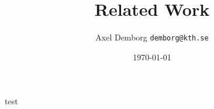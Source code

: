 \documentclass[11pt]{article}
\author{Axel Demborg \texttt{demborg@kth.se}}
\date{\today}
\title{Related Work}
\newcommand{\bibentry}[1]{\cite{#1}}
\begin{document}
\maketitle
 


tes\bibentry{Nobody06}t
\end{document}
